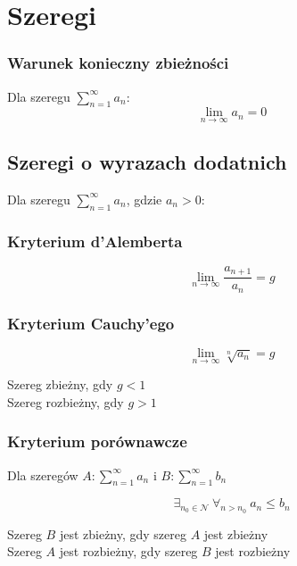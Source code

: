 \documentclass[11pt]{article}
\begin{document}
\section{Szeregi}

\subsubsection{Warunek konieczny zbieżności}
Dla szeregu $\sum_{n=1}^{\infty} a_n$:
\begin{equation}
	\lim_{n \to \infty} a_n = 0
\end{equation}

\subsection{Szeregi o wyrazach dodatnich}
Dla szeregu $\sum_{n=1}^{\infty} a_n$, gdzie $a_n > 0$:


\subsubsection{Kryterium d'Alemberta}
\begin{equation}
	\lim_{n \to \infty} \frac{a_{n+1}}{a_n} = g
\end{equation}


\subsubsection{Kryterium Cauchy'ego}
\begin{equation}
	\lim_{n \to \infty} \sqrt[n]{a_n} = g
\end{equation}

\noindent Szereg zbieżny, gdy $g < 1$\\
\noindent Szereg rozbieżny, gdy $g > 1$


\subsubsection{Kryterium porównawcze}
Dla szeregów
$A: \sum_{n=1}^{\infty} a_n$ i
$B: \sum_{n=1}^{\infty} b_n$

\begin{equation}
	\exists_{n_0 \in \mathscr{N}}\ \forall_{n > n_0}\ a_n \leq b_n
\end{equation}

\noindent Szereg $B$ jest zbieżny, gdy szereg $A$ jest zbieżny\\
\noindent Szereg $A$ jest rozbieżny, gdy szereg $B$ jest rozbieżny
\end{document}
